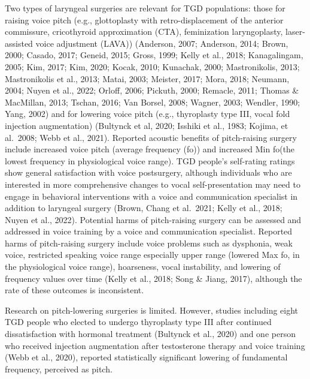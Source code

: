 \documentclass[
]{book}
\begin{document}
Two types of laryngeal surgeries are relevant for
TGD populations: those for raising voice pitch
(e.g., glottoplasty with retro-displacement of the
anterior commissure, cricothyroid approximation
(CTA), feminization laryngoplasty, laser-assisted
voice adjustment (LAVA)) (Anderson, 2007;
Anderson, 2014; Brown, 2000; Casado, 2017;
Geneid, 2015; Gross, 1999; Kelly et al., 2018;
Kanagalingam, 2005; Kim, 2017; Kim, 2020; Kocak,
2010; Kunachak, 2000; Mastronikolis, 2013;
Mastronikolis et al., 2013; Matai, 2003; Meister,
2017; Mora, 2018; Neumann, 2004; Nuyen et al.,
2022; Orloff, 2006; Pickuth, 2000; Remacle, 2011;
Thomas \& MacMillan, 2013; Tschan, 2016; Van
Borsel, 2008; Wagner, 2003; Wendler, 1990; Yang,
2002) and for lowering voice pitch (e.g., thyroplasty type III, vocal fold injection augmentation)
(Bultynck et al, 2020; Isshiki et al., 1983; Kojima,
et al.~2008; Webb et al., 2021). Reported acoustic
benefits of pitch-raising surgery include increased
voice pitch (average frequency (fo)) and increased
Min fo(the lowest frequency in physiological voice
range). TGD people's self-rating ratings show general satisfaction with voice postsurgery, although
individuals who are interested in more comprehensive changes to vocal self-presentation may
need to engage in behavioral interventions with a
voice and communication specialist in addition to
laryngeal surgery (Brown, Chang et al.~2021; Kelly
et al., 2018; Nuyen et al., 2022). Potential harms
of pitch-raising surgery can be assessed and
addressed in voice training by a voice and communication specialist. Reported harms of
pitch-raising surgery include voice problems such
as dysphonia, weak voice, restricted speaking voice
range especially upper range (lowered Max fo, in
the physiological voice range), hoarseness, vocal
instability, and lowering of frequency values over
time (Kelly et al., 2018; Song \& Jiang, 2017),
although the rate of these outcomes is inconsistent.

Research on pitch-lowering surgeries is limited. However, studies including eight TGD people who elected to undergo thyroplasty type III
after continued dissatisfaction with hormonal
treatment (Bultynck et al., 2020) and one person
who received injection augmentation after testosterone therapy and voice training (Webb
et al., 2020), reported statistically significant
lowering of fundamental frequency, perceived
as pitch.
\end{document}
